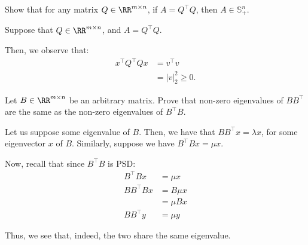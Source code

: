 \documentclass[openany]{book}
\begin{document}
\begin{hw}
	Show that for any matrix $Q \in \RR^{m \times n}$, if $A = Q^{\intercal}Q$, then $A \in \mathbb{S}_+^{n}$.
\end{hw}
\begin{solution}
	Suppose that $Q \in \RR^{m \times n}$, and $A = Q^{\intercal}Q$.
	
	Then, we observe that:
	\begin{align*}
		x^{\intercal}Q^{\intercal}Qx &= v^{\intercal}v \\
		&= \lvert v \rvert_2^{2} \geq 0.
	\end{align*}
\end{solution}

\begin{hw}
	Let $B \in \RR^{m \times n}$ be an arbitrary matrix. Prove that non-zero eigenvalues of $BB^{\intercal}$ are the same as the non-zero eigenvalues of $B^{\intercal}B$.
\end{hw}
\begin{solution}
	Let us suppose some eigenvalue of $B$. Then, we have that $BB^{\intercal}x = \lambda x$, for some eigenvector $x$ of $B$. Similarly, suppose we have $B^{\intercal}Bx = \mu x$.
	
	Now, recall that since $B^{\intercal}B$ is PSD:
	\begin{align*}
		B^{\intercal}Bx &= \mu x \\
		BB^{\intercal}Bx &= B\mu x\\
		&= \mu B x \\
		BB^{\intercal}y &= \mu y
	\end{align*}
	
	Thus, we see that, indeed, the two share the same eigenvalue.
\end{solution}
\end{document}
